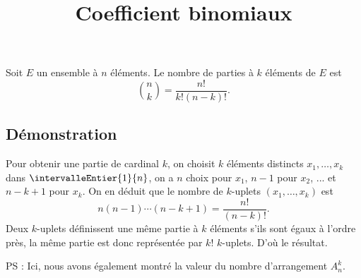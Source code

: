 \documentclass[fontsize=12pt,twoside=false,parskip=half]{scrartcl}
\title{Coefficient binomiaux}
\date{}
\author{}
\begin{document}
\maketitle
   \begin{Theoreme}
      Soit $E$ un ensemble à $n$ éléments. Le nombre de parties à $k$ éléments de $E$ est
      \[
         \binom{n}{k} = \frac{n!}{k!(n- k)!}.
      \]
   \end{Theoreme}
   \subsection{Démonstration}
      Pour obtenir une partie de cardinal $k$, on choisit $k$ éléments distincts $x_1, \ldots, x_k$ dans 
      $\intervalleEntier{1}{n}$, on a $n$ choix pour $x_1$, $n - 1$ pour $x_2$, ... et $n - k + 1$ pour $x_k$. On en 
      déduit que le nombre de $k$-uplets $(x_1, \ldots, x_k)$ est
      \[
         n(n - 1)\cdots(n - k + 1) = \frac{n!}{(n - k)!}.
      \]
      Deux $k$-uplets définissent une même partie à $k$ éléments s’ils sont égaux à l’ordre près, la même partie est
      donc représentée par $k!$ $k$-uplets. D’où le résultat.
      
      PS : Ici, nous avons également montré la valeur du nombre d’arrangement $A_n^k$.
\end{document}

